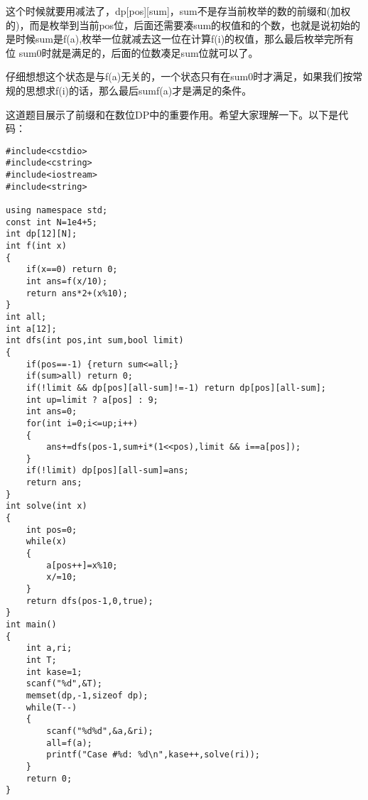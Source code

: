这个时候就要用减法了，dp[pos][sum]，sum不是存当前枚举的数的前缀和(加权的)，而是枚举到当前pos位，后面还需要凑sum的权值和的个数，也就是说初始的是时候sum是f(a),枚举一位就减去这一位在计算f(i)的权值，那么最后枚举完所有位 sum\leq 0时就是满足的，后面的位数凑足sum位就可以了。

仔细想想这个状态是与f(a)无关的，一个状态只有在sum\leq 0时才满足，如果我们按常规的思想求f(i)的话，那么最后sum\leq f(a)才是满足的条件。

这道题目展示了前缀和在数位DP中的重要作用。希望大家理解一下。以下是代码：
\begin{verbatim}
#include<cstdio>  
#include<cstring>  
#include<iostream>  
#include<string>  
  
using namespace std;  
const int N=1e4+5;  
int dp[12][N];  
int f(int x)  
{  
    if(x==0) return 0;  
    int ans=f(x/10);  
    return ans*2+(x%10);  
}  
int all;  
int a[12];  
int dfs(int pos,int sum,bool limit)  
{  
    if(pos==-1) {return sum<=all;}  
    if(sum>all) return 0;  
    if(!limit && dp[pos][all-sum]!=-1) return dp[pos][all-sum];  
    int up=limit ? a[pos] : 9;  
    int ans=0;  
    for(int i=0;i<=up;i++)  
    {  
        ans+=dfs(pos-1,sum+i*(1<<pos),limit && i==a[pos]);  
    }  
    if(!limit) dp[pos][all-sum]=ans;  
    return ans;  
}  
int solve(int x)  
{  
    int pos=0;  
    while(x)  
    {  
        a[pos++]=x%10;  
        x/=10;  
    }  
    return dfs(pos-1,0,true);  
}  
int main()  
{  
    int a,ri;  
    int T;  
    int kase=1;  
    scanf("%d",&T);  
    memset(dp,-1,sizeof dp);  
    while(T--)  
    {  
        scanf("%d%d",&a,&ri);  
        all=f(a);  
        printf("Case #%d: %d\n",kase++,solve(ri));  
    }  
    return 0;  
}  
\end{verbatim}
	\note